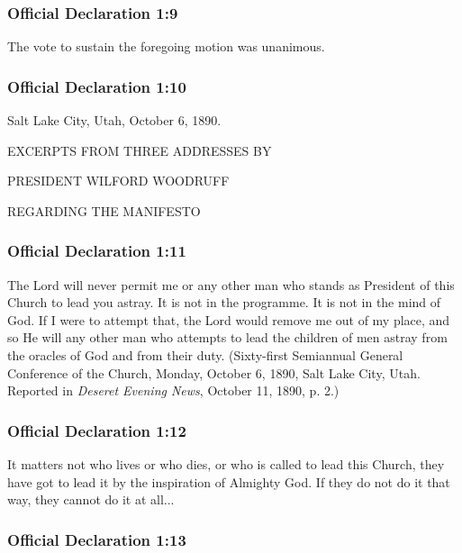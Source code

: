 	\subsubsection{Official Declaration 1:9} %
		\label{OD1-9}
		
		The vote to sustain the foregoing motion was unanimous.
		
	\subsubsection{Official Declaration 1:10} %
		\label{OD1-10}
		
		 Salt Lake City, Utah, October 6, 1890. 

		EXCERPTS FROM THREE ADDRESSES BY
		
		PRESIDENT WILFORD WOODRUFF
		
		REGARDING THE MANIFESTO		 
		
	\subsubsection{Official Declaration 1:11} %
		\label{OD1-11}
		
		The Lord will never permit me or any other man who stands as President of this Church to lead you astray.  It is not in the programme.  It is not in the mind of God.  If I were to attempt that, the Lord would remove me out of my place, and so He will any other man who attempts to lead the children of men astray from the oracles of God and from their duty.  (Sixty-first Semiannual General Conference of the Church, Monday, October 6, 1890, Salt Lake City, Utah.  Reported in \textit{Deseret Evening News}, October 11, 1890, p. 2.)
		
	\subsubsection{Official Declaration 1:12} %
		\label{OD1-12}
		
		It matters not who lives or who dies, or who is called to lead this Church, they have got to lead it by the inspiration of Almighty God.  If they do not do it that way, they cannot do it at all...
		
	\subsubsection{Official Declaration 1:13} %
		\label{OD1-13}
		
